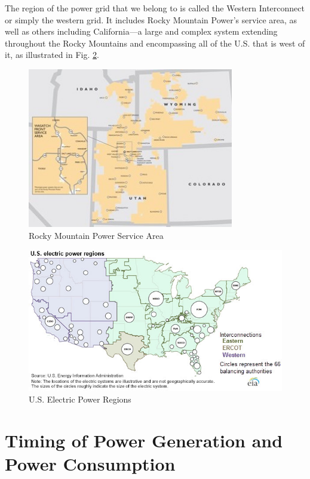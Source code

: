 \documentclass[10pt]{article}
\begin{document}
The region of the power grid that we belong to is called the Western Interconnect or simply the western grid. It includes Rocky Mountain Power's service area, as well as others including California---a large and complex system extending throughout the Rocky Mountains and encompassing all of the U.S. that is west of it, as illustrated in Fig. \ref{grid}.

\medskip
            \begin{figure}[h]
            \centering
            \includegraphics[width=9cm]{extras21/servicearea.jpg}
            \caption{Rocky Mountain Power Service Area \cite{servicearea}}
            \label{rmp}
            \end{figure}


            \begin{figure}[h]
            \centering
            \includegraphics[width=13.5cm]{extras21/elect_power_regions.jpg}
            \caption{U.S. Electric Power Regions  \cite{howelectricity}}
            \label{grid}
            \end{figure}



\section{Timing of Power Generation and Power Consumption%
}
\end{document}
